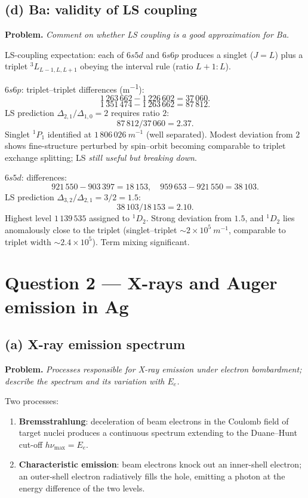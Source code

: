 \documentclass[11pt]{article}
\begin{document}
\subsection*{(d) Ba: validity of LS coupling}

\textbf{Problem.} \emph{Comment on whether LS coupling is a good approximation for Ba.}

LS-coupling expectation: each of $6s5d$ and $6s6p$ produces a singlet ($J=L$) plus a triplet $^{3}\!L_{L-1,L,L+1}$ obeying the interval rule (ratio $L+1:L$).

$6s6p$: triplet--triplet differences (\unit{m^{-1}}):
\[
1\,263\,662-1\,226\,602=37\,060.
\]
\[
1\,351\,474-1\,263\,662=87\,812.
\]
LS prediction $\Delta_{2,1}/\Delta_{1,0}=2$ requires ratio $2$:
\[
87\,812/37\,060=2.37.
\]
Singlet ${}^{1}\!P_1$ identified at $1\,806\,026\ \unit{m^{-1}}$ (well separated). Modest deviation from $2$ shows fine-structure perturbed by spin--orbit becoming comparable to triplet exchange splitting; LS \emph{still useful but breaking down}.

$6s5d$: differences:
\[
921\,550-903\,397=18\,153,\quad 959\,653-921\,550=38\,103.
\]
LS prediction $\Delta_{3,2}/\Delta_{2,1}=3/2=1.5$:
\[
38\,103/18\,153=2.10.
\]
Highest level $1\,139\,535$ assigned to $^{1}\!D_2$. Strong deviation from $1.5$, and $^{1}\!D_2$ lies anomalously close to the triplet (singlet--triplet $\sim 2\times 10^{5}\ \unit{m^{-1}}$, comparable to triplet width $\sim 2.4\times 10^{5}$). Term mixing significant.


\section*{Question 2 --- X-rays and Auger emission in Ag}

\subsection*{(a) X-ray emission spectrum}

\textbf{Problem.} \emph{Processes responsible for X-ray emission under electron bombardment; describe the spectrum and its variation with $E_e$.}

Two processes:
\begin{enumerate}
\item \textbf{Bremsstrahlung}: deceleration of beam electrons in the Coulomb field of target nuclei produces a continuous spectrum extending to the Duane--Hunt cut-off $h\nu_{\max}=E_e$.
\item \textbf{Characteristic emission}: beam electrons knock out an inner-shell electron; an outer-shell electron radiatively fills the hole, emitting a photon at the energy difference of the two levels.
\end{enumerate}
\end{document}
